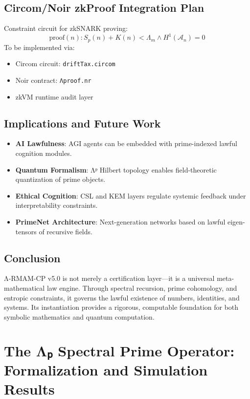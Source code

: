 \documentclass[12]{amsart}
\theoremstyle{plain}
\begin{document}
\subsection*{Circom/Noir zkProof Integration Plan}

Constraint circuit for zkSNARK proving:
\[
\text{proof}(n): S_p(n) + K(n) < \Lambda_m \wedge H^1(\mathcal{A}_n) = 0
\]
To be implemented via:
\begin{itemize}
    \item Circom circuit: \texttt{driftTax.circom}
    \item Noir contract: \texttt{Λproof.nr}
    \item zkVM runtime audit layer
\end{itemize}

\subsection*{Implications and Future Work}

\begin{itemize}
    \item \textbf{AI Lawfulness}: AGI agents can be embedded with prime-indexed lawful cognition modules.
    \item \textbf{Quantum Formalism}: Λᵖ Hilbert topology enables field-theoretic quantization of prime objects.
    \item \textbf{Ethical Cognition}: CSL and KEM layers regulate systemic feedback under interpretability constraints.
    \item \textbf{PrimeNet Architecture}: Next-generation networks based on lawful eigen-tensors of recursive fields.
\end{itemize}

\subsection*{Conclusion}

Λ-RMAM-CP v5.0 is not merely a certification layer—it is a universal meta-mathematical law engine. Through spectral recursion, prime cohomology, and entropic constraints, it governs the lawful existence of numbers, identities, and systems. Its instantiation provides a rigorous, computable foundation for both symbolic mathematics and quantum computation.

\section{The Λₚ Spectral Prime Operator: Formalization and Simulation Results}
\end{document}

